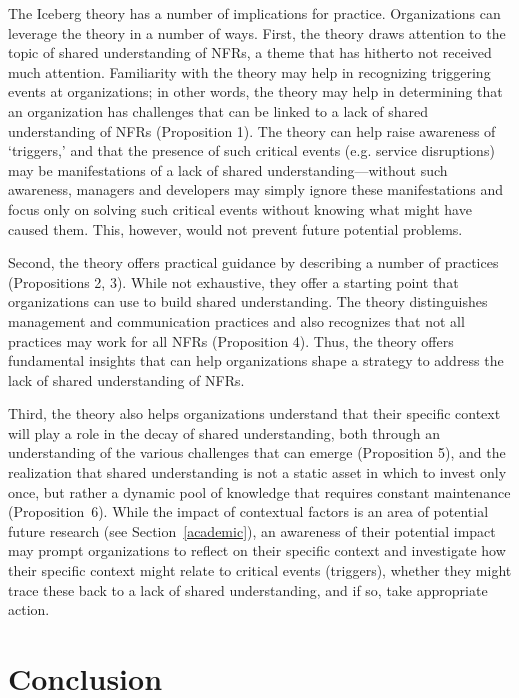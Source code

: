 \documentclass[smallextended]{svjour3}       %
\begin{document}
The Iceberg theory has a number of implications for practice. 
Organizations can leverage the theory in a number of ways. 
First, the theory draws attention to the topic of shared understanding of NFRs, a theme that has hitherto not received much attention. Familiarity with the theory may help in recognizing triggering events at organizations; in other words, the theory may help in determining that an organization has challenges that can be linked to a lack of shared understanding of NFRs (Proposition 1). 
The theory can help raise awareness of `triggers,' and that the presence of such critical events (e.g. service disruptions) may be manifestations of a lack of shared understanding---without such awareness, managers and developers may simply ignore these manifestations and focus only on solving such critical events without knowing what might have caused them. This, however, would not prevent future potential problems.

Second, the theory offers practical guidance by describing a number of practices (Propositions 2, 3). While not exhaustive, they offer a starting point that organizations can use to build shared understanding. The theory distinguishes management and communication practices and also recognizes that not all practices may work for all NFRs (Proposition 4). Thus, the theory offers fundamental insights that can help organizations shape a strategy to address the lack of shared understanding of NFRs. 

Third, the theory also helps organizations understand that their specific context will play a role in the decay of shared understanding, both through an understanding of the various challenges that can emerge (Proposition 5), and the realization that shared understanding is not a static asset in which to invest only once, but rather a dynamic pool of knowledge that requires constant maintenance (Proposition~6). 
While the impact of contextual factors is an area of potential future research (see Section~\ref{academic}), an awareness of their potential impact may prompt organizations to reflect on their specific context and investigate how their specific context might relate to critical events (triggers), whether they might trace these back to a lack of shared understanding, and if so, take appropriate action.








\section{Conclusion}
\label{sec:conclusion}
\end{document}
